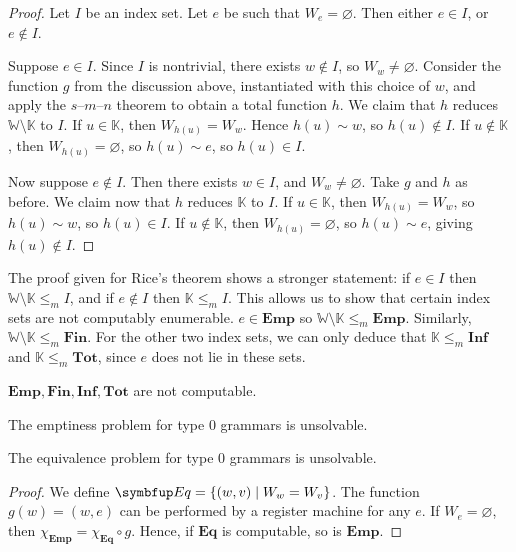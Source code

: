 \begin{proof}
	Let \( I \) be an index set.
	Let \( e \) be such that \( W_e = \varnothing \).
	Then either \( e \in I \), or \( e \not\in I \).

	Suppose \( e \in I \).
	Since \( I \) is nontrivial, there exists \( w \not\in I \), so \( W_w \neq \varnothing \).
	Consider the function \( g \) from the discussion above, instantiated with this choice of \( w \), and apply the \( s \)--\( m \)--\( n \) theorem to obtain a total function \( h \).
	We claim that \( h \) reduces \( \mathbb W \setminus \mathbb K \) to \( I \).
	If \( u \in \mathbb K \), then \( W_{h(u)} = W_w \).
	Hence \( h(u) \sim w \), so \( h(u) \not\in I \).
	If \( u \not\in \mathbb K \), then \( W_{h(u)} = \varnothing \), so \( h(u) \sim e \), so \( h(u) \in I \).

	Now suppose \( e \not\in I \).
	Then there exists \( w \in I \), and \( W_w \neq \varnothing \).
	Take \( g \) and \( h \) as before.
	We claim now that \( h \) reduces \( \mathbb K \) to \( I \).
	If \( u \in \mathbb K \), then \( W_{h(u)} = W_w \), so \( h(u) \sim w \), so \( h(u) \in I \).
	If \( u \not\in \mathbb K \), then \( W_{h(u)} = \varnothing \), so \( h(u) \sim e \), giving \( h(u) \not\in I \).
\end{proof}
\begin{remark}
	The proof given for Rice's theorem shows a stronger statement: if \( e \in I \) then \( \mathbb W \setminus \mathbb K \leq_m I \), and if \( e \not\in I \) then \( \mathbb K \leq_m I \).
	This allows us to show that certain index sets are not computably enumerable.
	\( e \in \mathbf{Emp} \) so \( \mathbb W \setminus \mathbb K \leq_m \mathbf{Emp} \).
	Similarly, \( \mathbb W \setminus \mathbb K \leq_m \mathbf{Fin} \).
	For the other two index sets, we can only deduce that \( \mathbb K \leq_m \mathbf{Inf} \) and \( \mathbb K \leq_m \mathbf{Tot} \), since \( e \) does not lie in these sets.
\end{remark}
\begin{corollary}
	\( \mathbf{Emp}, \mathbf{Fin}, \mathbf{Inf}, \mathbf{Tot} \) are not computable.
\end{corollary}
\begin{corollary}
	The emptiness problem for type 0 grammars is unsolvable.
\end{corollary}
\begin{corollary}
	The equivalence problem for type 0 grammars is unsolvable.
\end{corollary}
\begin{proof}
	We define \( \mathbf{Eq} = \qty{(w, v) \mid W_w = W_v} \).
	The function \( g(w) = (w, e) \) can be performed by a register machine for any \( e \).
	If \( W_e = \varnothing \), then \( \chi_{\mathbf{Emp}} = \chi_{\mathbf{Eq}} \circ g \).
	Hence, if \( \mathbf{Eq} \) is computable, so is \( \mathbf{Emp} \).
\end{proof}
